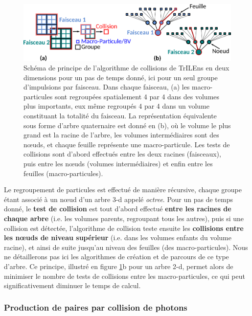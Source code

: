 \begin{refsection}
\begin{figure}[hbtp]
	\centering
	\includegraphics[width=\linewidth]{4-simulation/principe_TrILEns_BH.png}
	\caption{Schéma de principe de l'algorithme de collisions de TrILEns en deux dimensions pour un pas de temps donné, ici pour un seul groupe d'impulsions par faisceau. Dans chaque faisceau, (a) les macro-particules sont regroupées spatialement 4 par 4 dans des volumes plus importants, eux même regroupés 4 par 4 dans un volume constituant la totalité du faisceau. La représentation équivalente sous forme d'arbre quaternaire est donné en (b), où le volume le plus grand est la racine de l'arbre, les volumes intermédiaires sont des nœuds, et chaque feuille représente une macro-particule. Les tests de collisions sont d'abord effectués entre les deux racines (faisceaux), puis entre les nœuds (volumes intermédiaires) et enfin entre les feuilles (macro-particules).}
	\label{fig:4-trilens_algo}
\end{figure}

Le regroupement de particules est effectué de manière récursive, chaque groupe étant associé à un nœud d'un arbre 3-d appelé \textit{octree}. Pour un pas de temps donné, le \textbf{test de collision} est tout d'abord effectué \textbf{entre les racines de chaque arbre} (i.e. les volumes parents, regroupant tous les autres), puis si une collision est détectée, l'algorithme de collision teste ensuite les \textbf{collisions entre les nœuds de niveau supérieur} (i.e. dans les volumes enfants du volume racine), et ainsi de suite jusqu'au niveau des feuilles (des macro-particules). Nous ne détaillerons pas ici les algorithmes de création et de parcours de ce type d'arbre. Ce principe, illustré en figure \ref{fig:4-trilens_algo}b pour un arbre 2-d, permet alors de minimiser le nombre de tests de collisions entre les macro-particules, ce qui peut significativement diminuer le temps de calcul.


\subsubsection{Production de paires par collision de photons}


\end{refsection}
